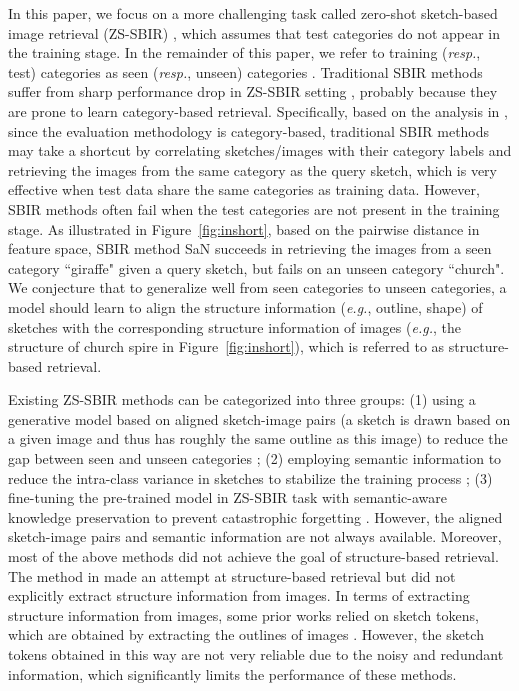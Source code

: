 \documentclass[10pt,twocolumn,letterpaper]{article}
\begin{document}
In this paper, we focus on a more challenging task called zero-shot sketch-based image retrieval (ZS-SBIR) \cite{shen2018zero}, which assumes that test categories do not appear in the training stage. In the remainder of this paper, we refer to training  (\emph{resp.}, test) categories as seen (\emph{resp.}, unseen) categories \cite{dupont2018learning}.
Traditional SBIR methods suffer from sharp performance drop in ZS-SBIR setting \cite{yelamarthi2018zero}, probably because they are prone to learn category-based retrieval.
Specifically, based on the analysis in \cite{yelamarthi2018zero}, since the evaluation methodology is category-based, traditional SBIR methods may take a shortcut by correlating sketches/images with their category labels and retrieving the images from the same category as the query sketch, which is very effective when test data share the same categories as training data. 
However, SBIR methods often fail when the test categories are not present in the training stage. 
As illustrated in Figure~\ref{fig:inshort}, based on the pairwise distance in feature space, SBIR method SaN \cite{yu2017sketch} succeeds in retrieving the images from a seen category ``giraffe" given a query sketch, but fails on an unseen category ``church". We conjecture that to generalize well from seen categories to unseen categories, a model should learn to align the structure information (\emph{e.g.}, outline, shape) of sketches with the corresponding structure information of images (\emph{e.g.}, the structure of church spire in Figure~\ref{fig:inshort}), which is referred to as structure-based retrieval.

Existing ZS-SBIR methods can be categorized into three groups:
(1) using a generative model based on aligned sketch-image pairs (a sketch is drawn based on a given image and thus has roughly the same outline as this image) to reduce the gap between seen and unseen categories \cite{yelamarthi2018zero}; 
(2) employing semantic information to reduce the intra-class variance in sketches to stabilize the training process \cite{xu2019semantic, wang2019stacked, dutta2019semantically, shen2018zero}; 
(3) fine-tuning the pre-trained model in ZS-SBIR task with semantic-aware knowledge preservation to prevent catastrophic forgetting \cite{liu2019semantic}. 
However, the aligned sketch-image pairs and semantic information are not always available. Moreover, most of the above methods did not achieve the goal of structure-based retrieval. The method in \cite{yelamarthi2018zero} made an attempt at structure-based retrieval but did not explicitly extract structure information from images. 
In terms of extracting structure information from images, some prior works relied on sketch tokens, which are obtained by extracting the outlines of images \cite{liu2017deep, wang2015sketch, yu2016sketch}. However, the sketch tokens obtained in this way are not very reliable due to the noisy and redundant information, which significantly limits the performance of these methods.
\end{document}
